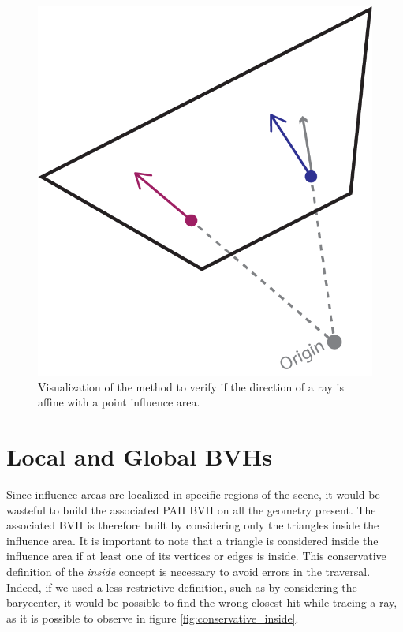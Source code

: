\documentclass{PoliMi_MasterThesis}
\begin{document}
\begin{figure}[]
    \centering
    \includegraphics[width=\textwidth*\real{0.35}]{Images/direction_affinity.png}
    \caption{Visualization of the method to verify if the direction of a ray is affine with a point influence area.}
    \label{fig:affine_direction}
\end{figure}

\section{Local and Global BVHs} \label{sec:local_and_global_bvhs}

Since influence areas are localized in specific regions of the scene, it would be wasteful to build the associated PAH BVH on all the geometry present. The associated BVH is therefore built by considering only the triangles inside the influence area. It is important to note that a triangle is considered inside the influence area if at least one of its vertices or edges is inside. This conservative definition of the \textit{inside} concept is necessary to avoid errors in the traversal. Indeed, if we used a less restrictive definition, such as by considering the barycenter, it would be possible to find the wrong closest hit while tracing a ray, as it is possible to observe in figure \ref{fig:conservative_inside}.
\end{document}
